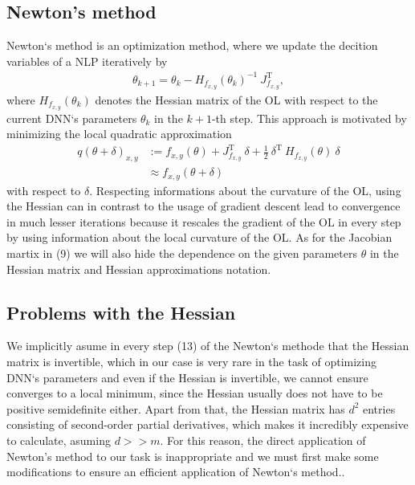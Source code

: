 \documentclass[conference]{IEEEtran}
\begin{document}
\subsection{Newton's method}\label{AA}
Newton`s method is an optimization method, where we update the decition variables of a NLP iteratively by
\begin{align}
 \theta_{k+1} = \theta_{k} -H_{f_{x, y}}(\theta_{k})^{-1}\:J_{f_{x, y}}^{\mathrm{T}},
\end{align}
where $H_{f_{x, y}}(\theta_{k})$ denotes the Hessian matrix of the OL with respect to the current DNN`s parameters $\theta_{k}$ in the $k+1$-th step. This approach is motivated by minimizing the local quadratic approximation
\begin{align}
q(\theta + \delta)_{x, y} &:= f_{x, y}(\theta) + J_{f_{x, y}}^{\mathrm{T}}\:\delta + \frac{1}{2}\:\delta^{\mathrm{T}}\:H_{f_{x, y}}(\theta)\:\delta\\
&\approx f_{x, y}(\theta + \delta)
\end{align}
with respect to $\delta$. 
Respecting informations about the curvature of the OL, using the Hessian can in contrast to the usage of gradient descent lead to convergence in much lesser iterations because it rescales the gradient of the OL in every step by using information about the local curvature of the OL. As for the Jacobian martix in (9) we will also hide the dependence on the given parameters $\theta$ in the Hessian matrix and Hessian approximations notation.

\subsection{Problems with the Hessian}
We implicitly asume in every step (13) of the Newton`s methode that the Hessian matrix is invertible, which in our case is very rare in the task of optimizing DNN`s parameters and even if the Hessian is invertible, we cannot ensure converges to a local minimum, since the Hessian usually does not have to be positive semidefinite either. Apart from that, the Hessian matrix has $d^{2}$ entries consisting of second-order partial derivatives, which makes it incredibly expensive to calculate, asuming $d>>m$. For this reason, the direct application of Newton's method to our task is inappropriate and we must first make some modifications to ensure an efficient application of Newton`s method..
\end{document}
